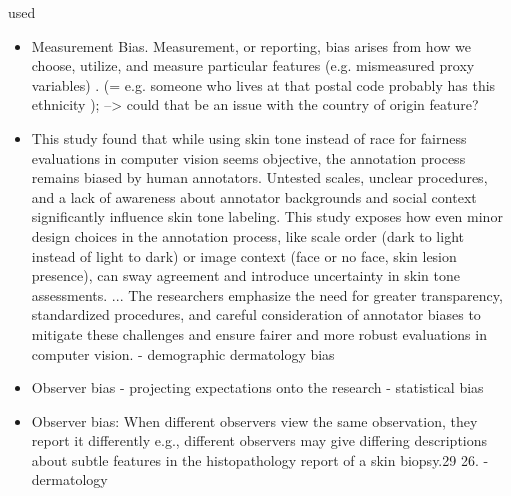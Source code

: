 \documentclass[12pt, a4paper, oneside]{book}   	%
\newif\ifrawcitationactive
\newcommand{\rawcitationstart}{\color{purple}\rawcitationactivetrue}
\newcommand{\rawcitationusedstart}{\color{violet}}
\begin{document}
			
			\rawcitationstart
			used
			\begin{itemize}		
				\rawcitationusedstart
				\item Measurement Bias. Measurement, or reporting, bias arises from how we choose, utilize, and measure particular features \autocite{M144_Suresh_2021} (e.g. mismeasured proxy variables) \autocite{Mehrabi_2021}. (= e.g. someone who lives at that postal code probably has this ethnicity ); --> could that be an issue with the country of origin feature?
			
				\item This study found that while using skin tone instead of race for fairness evaluations in computer vision seems objective, the annotation process remains biased by human annotators. Untested scales, unclear procedures, and a lack of awareness about annotator backgrounds and social context significantly influence skin tone labeling. This study exposes how even minor design choices in the annotation process, like scale order (dark to light instead of light to dark) or image context (face or no face, skin lesion presence), can sway agreement and introduce uncertainty in skin tone assessments. ... The researchers emphasize the need for greater transparency, standardized procedures, and careful consideration of annotator biases to mitigate these challenges and ensure fairer and more robust evaluations in computer vision. \autocite{Montoya_2025} - demographic dermatology bias
			
				\item Observer bias - projecting expectations onto the research \autocites{Mester_2022}{Mester_2017} - statistical bias
				\item  Observer bias: When different observers view the same observation, they report it differently e.g., different observers may give differing descriptions about subtle features in the histopathology report of a skin biopsy.29 26. \autocite{Chakraborty_2024} - dermatology
					

\end{itemize}
\end{document}
